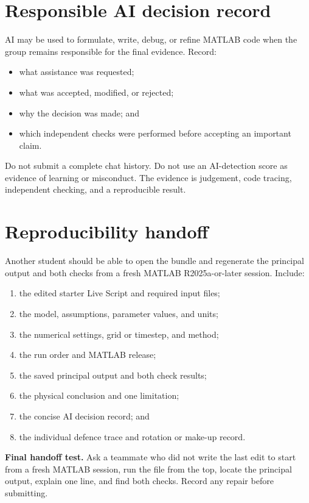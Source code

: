 \documentclass[11pt,a4paper]{article}
\begin{document}
\section*{Responsible AI decision record}
AI may be used to formulate, write, debug, or refine MATLAB code when the group remains responsible for the final evidence. Record:
\begin{itemize}[nosep,leftmargin=6mm]
\item what assistance was requested;
\item what was accepted, modified, or rejected;
\item why the decision was made; and
\item which independent checks were performed before accepting an important claim.
\end{itemize}
Do not submit a complete chat history. Do not use an AI-detection score as evidence of learning or misconduct. The evidence is judgement, code tracing, independent checking, and a reproducible result.
\section*{Reproducibility handoff}
Another student should be able to open the bundle and regenerate the principal output and both checks from a fresh MATLAB R2025a-or-later session. Include:
\begin{enumerate}[nosep,leftmargin=6mm]
\item the edited starter Live Script and required input files;
\item the model, assumptions, parameter values, and units;
\item the numerical settings, grid or timestep, and method;
\item the run order and MATLAB release;
\item the saved principal output and both check results;
\item the physical conclusion and one limitation;
\item the concise AI decision record; and
\item the individual defence trace and rotation or make-up record.
\end{enumerate}
\begin{keybox}\textbf{Final handoff test.} Ask a teammate who did not write the last edit to start from a fresh MATLAB session, run the file from the top, locate the principal output, explain one line, and find both checks. Record any repair before submitting.\end{keybox}
\end{document}
